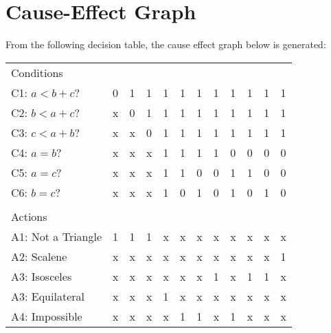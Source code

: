 \documentclass[letterpaper]{article}
\begin{document}
\section{Cause-Effect Graph}
From the following decision table, the cause effect graph below is generated:
\begin{adjustbox}{center}
	\begin{tabular}{llllllllllll}
		Conditions         &   &   &   &   &   &   &   &   &   &   &   \\ \cline{1-1}
		C1: $a<b+c$?       & 0 & 1 & 1 & 1 & 1 & 1 & 1 & 1 & 1 & 1 & 1 \\
		C2: $b<a+c$?       & x & 0 & 1 & 1 & 1 & 1 & 1 & 1 & 1 & 1 & 1 \\
		C3: $c<a+b$?       & x & x & 0 & 1 & 1 & 1 & 1 & 1 & 1 & 1 & 1 \\
		C4: $a=b$?         & x & x & x & 1 & 1 & 1 & 1 & 0 & 0 & 0 & 0 \\
		C5: $a=c$?         & x & x & x & 1 & 1 & 0 & 0 & 1 & 1 & 0 & 0 \\
		C6: $b=c$?         & x & x & x & 1 & 0 & 1 & 0 & 1 & 0 & 1 & 0 \\
		                   &   &   &   &   &   &   &   &   &   &   &   \\
		Actions            &   &   &   &   &   &   &   &   &   &   &   \\ \cline{1-1}
		A1: Not a Triangle & 1 & 1 & 1 & x & x & x & x & x & x & x & x \\
		A2: Scalene        & x & x & x & x & x & x & x & x & x & x & 1 \\
		A3: Isosceles      & x & x & x & x & x & x & 1 & x & 1 & 1 & x \\
		A3: Equilateral    & x & x & x & 1 & x & x & x & x & x & x & x \\
		A4: Impossible     & x & x & x & x & 1 & 1 & x & 1 & x & x & x \\
	\end{tabular}
\end{adjustbox}

\end{document}

